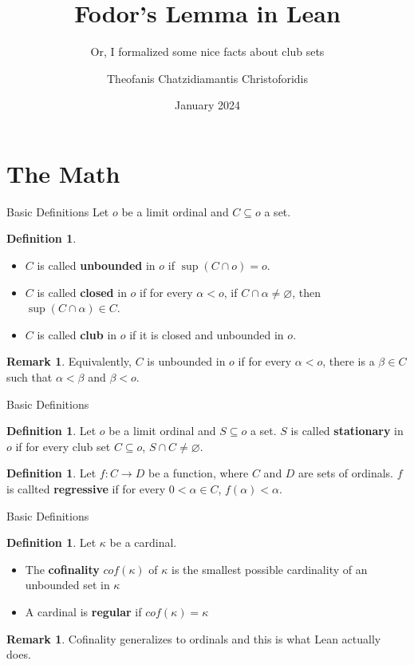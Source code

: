 \documentclass{beamer}
\title{Fodor's Lemma in Lean}
\subtitle{Or, I formalized some nice facts about club sets}
\author{Theofanis Chatzidiamantis Christoforidis}
\date{January 2024}
\theoremstyle{definition}
\newtheorem{defin}[subsection]{Definition}
\newtheorem{rem}[subsection]{Remark}
\begin{document}
\maketitle

\section{The Math}

\begin{frame}{Basic Definitions}
    Let $o$ be a limit ordinal and $C \subseteq o$ a set.
    \begin{defin}
        \begin{itemize} \itemsep0.2em
        \item $C$ is called \textbf{unbounded} in $o$ if $\sup (C\cap o)=o$.
        \pause
        \item $C$ is called \textbf{closed} in $o$ if for every $\alpha < o$, if $C\cap\alpha\neq\varnothing$, then $\sup (C\cap \alpha)\in C$.
        \pause
        \item $C$ is called \textbf{club} in $o$ if it is closed and unbounded in $o$.
        \end{itemize}
    \end{defin}
    \pause
    \begin{rem}
        Equivalently, $C$ is unbounded in $o$ if for every $\alpha < o$, there is a $\beta\in C$ such that $\alpha<\beta$ and $\beta < o$.
    \end{rem}
\end{frame}

\begin{frame}{Basic Definitions}
    \begin{defin}
    Let $o$ be a limit ordinal and $S\subseteq o$ a set. $S$ is called \textbf{stationary} in $o$ if for every club set $C\subseteq o$, $S\cap C\neq\varnothing$.
\end{defin}
\pause
\begin{defin}
    Let $f:C\to D$ be a function, where $C$ and $D$ are sets of ordinals. $f$ is callted \textbf{regressive} if for every $0 < \alpha \in C$, $f(\alpha) < \alpha$.
\end{defin}
\end{frame}

\begin{frame}{Basic Definitions}
    \begin{defin}
        Let $\kappa$ be a cardinal.
        \begin{itemize}
            \item The \textbf{cofinality} $cof(\kappa)$ of $\kappa$ is the smallest possible cardinality of an unbounded set in $\kappa$ \pause
            \item A cardinal is \textbf{regular} if $cof(\kappa)=\kappa$
        \end{itemize} \pause
        \begin{rem}
            Cofinality generalizes to ordinals and this is what Lean actually does.
        \end{rem}
    \end{defin}

\end{frame}
\end{document}

